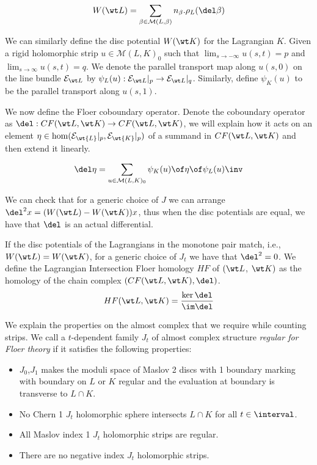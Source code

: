 \begin{equation} \label{eq:discpot}
    W(\wt L) = \sum_{\beta \in \mathcal{M}(L,\beta)} n_\beta . \rho_L (\del \beta)
\end{equation}

We can similarly define the disc potential $W(\wt K)$ for the Lagrangian $K$. Given a rigid holomorphic strip $u\in \mathcal{M}(L,K)_0$ such that $\lim_{s\to -\infty}u(s,t)=p$ and $\lim_{s\to \infty }u(s,t)=q$. We denote the parallel transport map along $u(s,0)$ on the line bundle $\mathcal{E}_{\wt L}$ by  $\psi_L(u): \mathcal{E}_{\wt L}|_p \to \mathcal{E}_{\wt L}|_q $.  Similarly, define $\psi_K(u)$ to be the parallel transport along $u(s,1)$.

We now define the Floer coboundary  operator. Denote the coboundary operator as $\del : CF(\wt L, \wt K) \to CF(\wt L, \wt K) $, we will explain how  it acts on an element $\eta \in \hom (\mathcal{E}_{\wt {L}}|_p,\mathcal{E}_{\wt {K}}|_p )$ of a summand in $CF(\wt L, \wt K)$ and then extend it linearly.

\begin{equation*}
    \del \eta = \sum_{u\in \mathcal{M}(L,K)_0} \psi_K(u) \of \eta \of \psi_L(u)\inv
\end{equation*}

\noindent We can check that for a generic choice of $J$ we can arrange $\del^2 x = (W(\wt L) - W(\wt K)) x$, thus when the disc potentials are equal, we have that $\del$ is an actual differential.

\begin{Theorem}

If the disc potentials of the Lagrangians in the monotone pair match, i.e.,  $W(\wt L ) = W(\wt K)$, for a generic choice of $J_t$ we have that $\del^2=0$. We define the Lagrangian Intersection Floer homology $HF$ of $(\wt L$, $\wt K)$ as the homology of the chain complex $(CF(\wt L, \wt K),\del)$. $$HF (\wt L, \wt K) = \frac{\ker \del }{\im \del}$$

\end{Theorem}

We explain the properties on the almost complex that we require while counting strips.  We call a $t$-dependent family $J_t$ of almost complex structure \textit{regular for Floer theory} if it satisfies the following properties:
\begin{itemize}
    \item $J_0$,$J_1$ makes the moduli space of Maslov 2 discs with 1 boundary marking with boundary on $L$ or $K$ regular and the evaluation at boundary is transverse to $L \cap K$.
    \item No Chern 1 $J_t$ holomorphic sphere intersects $L\cap K$ for all $t \in \interval$.
    \item All Maslov index 1 $J_t$ holomorphic strips are regular.
    \item There are no negative index $J_t$ holomorphic strips.
\end{itemize}

